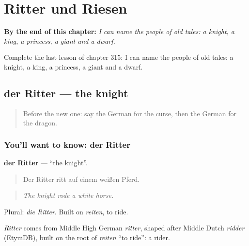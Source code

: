 
\chapter{Ritter und Riesen}
\label{ch:ge-ritter-und-riesen}

\begin{chapteropening}
\textbf{By the end of this chapter:} \emph{I can name the people of old tales: a knight, a king, a princess, a giant and a dwarf.}

Complete the last lesson of chapter 315: I can name the people of old tales: a knight, a king, a princess, a giant and a dwarf.
\end{chapteropening}

\section[der Ritter]{der Ritter — the knight}

\label{lesson:GE-C315-ritter}



\begin{quote}
Before the new one: say the German for the curse, then the German for the dragon.
\end{quote}

\subsection*{You'll want to know: der Ritter}
\textbf{der Ritter} — \textquotedblleft{}the knight\textquotedblright{}.

\begin{quote}
Der Ritter ritt auf einem weißen Pferd.
\end{quote}

\begin{quote}
\emph{The knight rode a white horse.}
\end{quote}

Plural: \emph{die Ritter}. Built on \emph{reiten}, to ride.

\begin{cousinweb}
\emph{Ritter} comes from Middle High German \emph{ritter}, shaped after Middle Dutch \emph{ridder} (EtymDB), built on the root of \emph{reiten} \textquotedblleft{}to ride\textquotedblright{}: a rider.
\end{cousinweb}

